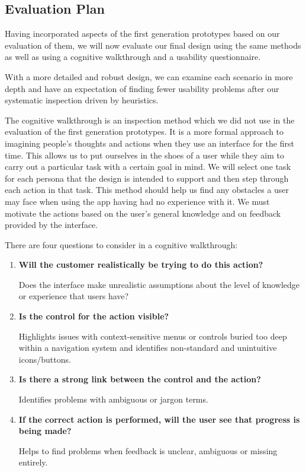\subsection{Evaluation Plan}
\label{sub:evaluation_plan}

Having incorporated aspects of the first generation prototypes based on our
evaluation of them, we will now evaluate our final design using the same
methods as well as using a cognitive walkthrough and a usability questionnaire.

With a more detailed and robust design, we can examine each scenario in more
depth and have an expectation of finding fewer usability problems after our
systematic inspection driven by heuristics.

The cognitive walkthrough is an inspection method which we did not use in the
evaluation of the first generation prototypes. It is a more formal approach to
imagining people's thoughts and actions when they use an interface for the
first time. This allows us to put ourselves in the shoes of a user while they
aim to carry out a particular task with a certain goal in mind. We will select
one task for each persona that the design is intended to support and then step
through each action in that task. This method should help us find any obstacles
a user may face when using the app having had no experience with it. We must
motivate the actions based on the user's general knowledge and on feedback
provided by the interface.

There are four questions to consider in a cognitive walkthrough\cite{cogwalk}:
\begin{enumerate}
	\item \textbf{Will the customer realistically be trying to do this action?}

	Does the interface make unrealistic assumptions about the level of
	knowledge or experience that users have?

	\item \textbf{Is the control for the action visible?}

	Highlights issues with context-sensitive menus or controls buried too deep
	within a navigation system and identifies non-standard and unintuitive
	icons/buttons.

	\item \textbf{Is there a strong link between the control and the action?}

	Identifies problems with ambiguous or jargon terms.

	\item \textbf{If the correct  action is performed, will the user see that
		progress is being made?}

	Helps to find problems when feedback is unclear, ambiguous or missing
	entirely.

\end{enumerate}
\bigskip

